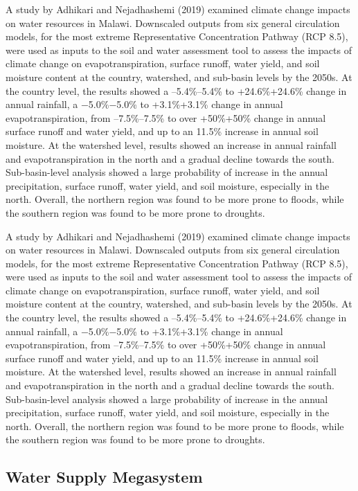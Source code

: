 \documentclass[
]{book}
\begin{document}
A study by Adhikari and Nejadhashemi (2019) examined climate change impacts on water resources in Malawi. Downscaled outputs from six general circulation models, for the most extreme Representative Concentration Pathway (RCP 8.5), were used as inputs to the soil and water assessment tool to assess the impacts of climate change on evapotranspiration, surface runoff, water yield, and soil moisture content at the country, watershed, and sub-basin levels by the 2050s. At the country level, the results showed a --5.4\%--5.4\% to +24.6\%+24.6\% change in annual rainfall, a −5.0\%−5.0\% to +3.1\%+3.1\% change in annual evapotranspiration, from --7.5\%--7.5\% to over +50\%+50\% change in annual surface runoff and water yield, and up to an 11.5\% increase in annual soil moisture. At the watershed level, results showed an increase in annual rainfall and evapotranspiration in the north and a gradual decline towards the south. Sub-basin-level analysis showed a large probability of increase in the annual precipitation, surface runoff, water yield, and soil moisture, especially in the north. Overall, the northern region was found to be more prone to floods, while the southern region was found to be more prone to droughts.

A study by Adhikari and Nejadhashemi (2019) examined climate change impacts on water resources in Malawi. Downscaled outputs from six general circulation models, for the most extreme Representative Concentration Pathway (RCP 8.5), were used as inputs to the soil and water assessment tool to assess the impacts of climate change on evapotranspiration, surface runoff, water yield, and soil moisture content at the country, watershed, and sub-basin levels by the 2050s. At the country level, the results showed a --5.4\%--5.4\% to +24.6\%+24.6\% change in annual rainfall, a −5.0\%−5.0\% to +3.1\%+3.1\% change in annual evapotranspiration, from --7.5\%--7.5\% to over +50\%+50\% change in annual surface runoff and water yield, and up to an 11.5\% increase in annual soil moisture. At the watershed level, results showed an increase in annual rainfall and evapotranspiration in the north and a gradual decline towards the south. Sub-basin-level analysis showed a large probability of increase in the annual precipitation, surface runoff, water yield, and soil moisture, especially in the north. Overall, the northern region was found to be more prone to floods, while the southern region was found to be more prone to droughts.

\hypertarget{water-supply-megasystem}{%
\subsection{Water Supply Megasystem}\label{water-supply-megasystem}}
\end{document}
